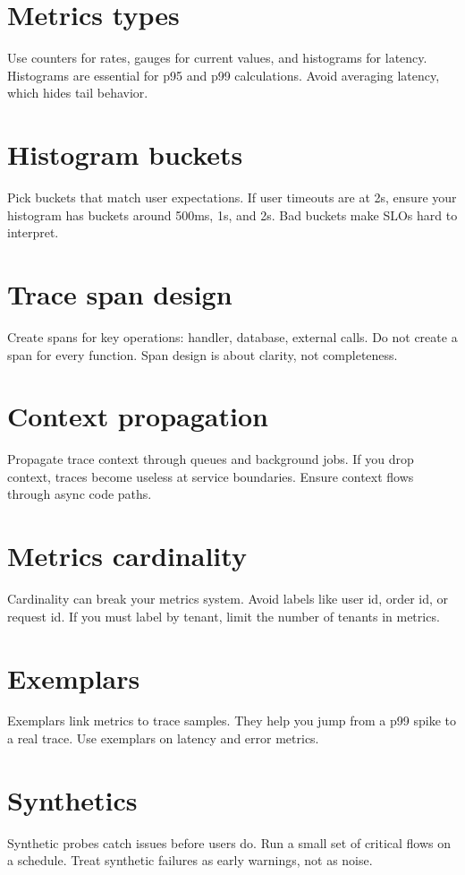 \section{Metrics types}
Use counters for rates, gauges for current values, and histograms for latency.
Histograms are essential for p95 and p99 calculations.
Avoid averaging latency, which hides tail behavior.

\section{Histogram buckets}
Pick buckets that match user expectations.
If user timeouts are at 2s, ensure your histogram has buckets around 500ms, 1s, and 2s.
Bad buckets make SLOs hard to interpret.

\section{Trace span design}
Create spans for key operations: handler, database, external calls.
Do not create a span for every function.
Span design is about clarity, not completeness.

\section{Context propagation}
Propagate trace context through queues and background jobs.
If you drop context, traces become useless at service boundaries.
Ensure context flows through async code paths.

\section{Metrics cardinality}
Cardinality can break your metrics system.
Avoid labels like user id, order id, or request id.
If you must label by tenant, limit the number of tenants in metrics.

\section{Exemplars}
Exemplars link metrics to trace samples.
They help you jump from a p99 spike to a real trace.
Use exemplars on latency and error metrics.

\section{Synthetics}
Synthetic probes catch issues before users do.
Run a small set of critical flows on a schedule.
Treat synthetic failures as early warnings, not as noise.


